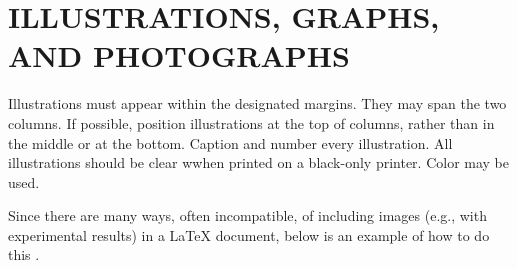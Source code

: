 \documentclass{article}
\begin{document}
\section{ILLUSTRATIONS, GRAPHS, AND PHOTOGRAPHS}
\label{sec:illust}

Illustrations must appear within the designated margins.  They may span the two
columns.  If possible, position illustrations at the top of columns, rather
than in the middle or at the bottom.  Caption and number every illustration.
All illustrations should be clear wwhen printed on a black-only printer. Color
may be used.

Since there are many ways, often incompatible, of including images (e.g., with
experimental results) in a LaTeX document, below is an example of how to do
this \cite{Lamp86}.

\end{document}

